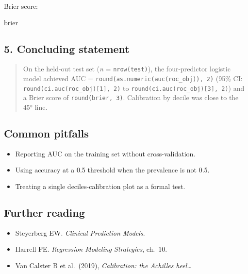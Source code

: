 \documentclass[
]{article}
\newenvironment{Shaded}{\begin{snugshade}}{\end{snugshade}}
\newcommand{\NormalTok}[1]{#1}
\providecommand{\tightlist}{%
  \setlength{\itemsep}{0pt}\setlength{\parskip}{0pt}}
\begin{document}
Brier score:

\begin{Shaded}
\begin{Highlighting}[]
\NormalTok{brier}
\end{Highlighting}
\end{Shaded}

\subsection{5. Concluding statement}\label{concluding-statement}

\begin{quote}
On the held-out test set (\emph{n} = \texttt{nrow(test)}), the
four-predictor logistic model achieved AUC =
\texttt{round(as.numeric(auc(roc\_obj)),\ 2)} (95\% CI:
\texttt{round(ci.auc(roc\_obj){[}1{]},\ 2)} to
\texttt{round(ci.auc(roc\_obj){[}3{]},\ 2)}) and a Brier score of
\texttt{round(brier,\ 3)}. Calibration by decile was close to the 45°
line.
\end{quote}

\subsection{Common pitfalls}\label{common-pitfalls}

\begin{itemize}
\tightlist
\item
  Reporting AUC on the training set without cross-validation.
\item
  Using accuracy at a 0.5 threshold when the prevalence is not 0.5.
\item
  Treating a single deciles-calibration plot as a formal test.
\end{itemize}

\subsection{Further reading}\label{further-reading}

\begin{itemize}
\tightlist
\item
  Steyerberg EW. \emph{Clinical Prediction Models}.
\item
  Harrell FE. \emph{Regression Modeling Strategies}, ch.~10.
\item
  Van Calster B et al.~(2019), \emph{Calibration: the Achilles
  heel\ldots{}}
\end{itemize}
\end{document}
